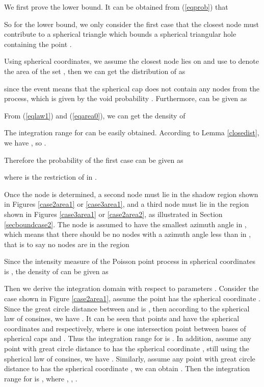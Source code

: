 \documentclass[journal, twoside]{IEEEtran}
\begin{document}
\begin{IEEEproof}
We first prove the lower bound. It can be obtained from (\ref{eqprob}) that


So for the lower bound, we only consider the first case that the closest node  must contribute to a
spherical triangle which bounds a spherical triangular hole containing the point .

Using spherical coordinates, we assume the closest node  lies on 
 and use  to denote the area of the set , then we can get the distribution of  as


\noindent since the event  means that the spherical cap 
does not contain any nodes from the process, which is given by the void probability
. Furthermore,  can be given as 


From (\ref{eqlaw1}) and (\ref{eqarea0}), we can get the density of 


The integration range for  can be easily obtained. According to 
Lemma \ref{closedist}, we have ,
so .

Therefore the probability of the first case can be given as 


\noindent where  is the restriction of  in . 

Once the node  is determined, a second node  must lie in the shadow 
region  shown in Figures \ref{case2area1} or \ref{case3area1}, and a third node  must lie in the 
region  shown in Figures \ref{case3area1} or \ref{case2area2}, as illustrated in Section \ref{secboundcase2}.
The node  is assumed to have the smallest
azimuth angle in , which means that there should be no nodes with a azimuth angle
less than  in , that is to say no nodes are in the region


Since the intensity measure of the Poisson point process in spherical
coordinates is , the density  of
 can be given as


Then we derive the integration domain  with respect to parameters . Consider the case shown in Figure \ref{case2area1},
assume the point  has the spherical coordinate .
Since the great circle distance between  and  is , 
then according to the spherical law of consines, we have
.
It can be seen that points  and  have
the spherical coordinates  and
 respectively, where  is one intersection 
point between bases of spherical caps  and . Thus the integration
range for  is .
In addition, assume any point with great circle distance  to 
 has the spherical coordinate ,
still using the spherical law of consines, we have 
.
Similarly, assume any point with great circle distance 
to  has the spherical coordinate ,
we can obtain . Then the integration range for 
is , where , , .


\end{IEEEproof}
\end{document}
